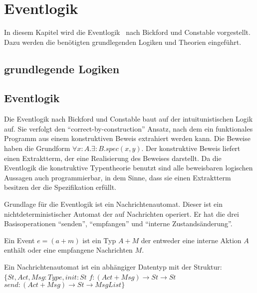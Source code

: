 %
\section{Eventlogik}
\label{sec_logik}

In diesem Kapitel wird die Eventlogik~\cite{bickford2003logic} nach Bickford und
Constable vorgestellt. Dazu werden die benötigten grundlegenden Logiken
und Theorien eingeführt.

\subsection{grundlegende Logiken}

\subsection{Eventlogik}
Die Eventlogik nach Bickford und Constable baut auf der intuitunistischen Logik
auf. Sie verfolgt den ``correct-by-construction'' Ansatz, nach dem ein
funktionales Programm aus einem konstruktiven Beweis extrahiert werden kann.
Die Beweise haben die Grundform $\forall x:A.\exists : B.spec(x,y)$. Der konstruktive Beweis
liefert einen Extraktterm, der eine Realisierung des Beweises darstellt.
Da die Eventlogik die konstruktive Typentheorie benutzt sind alle
beweisbaren logischen Aussagen auch programmierbar, in dem Sinne, dass sie einen
Extraktterm besitzen der die Spezifikation erfüllt.~\cite{bickford2003logic}

Grundlage für die Eventlogik ist ein Nachrichtenautomat. Dieser ist ein
nichtdeterministischer Automat der auf Nachrichten operiert.
Er hat die drei Basisoperationen ``senden'', ``empfangen'' und ``interne
Zustandsänderung''.~\cite{bickford2003logic}

\begin{defi}
  Ein Event $e=(a+m)$ ist ein Typ $A+M$ der entweder eine interne Aktion $A$ enthält
  oder eine empfangene Nachrichten $M$.
\end{defi}

\begin{defi}
  Ein Nachrichtenautomat ist ein abhängiger Datentyp mit der Struktur:
  $\{St, Act, Msg: Type, init: St$
    $f:(Act+Msg)\rightarrow St\rightarrow St$
    $send:(Act+Msg)\rightarrow St\rightarrow MsgList\}$  
\end{defi}

